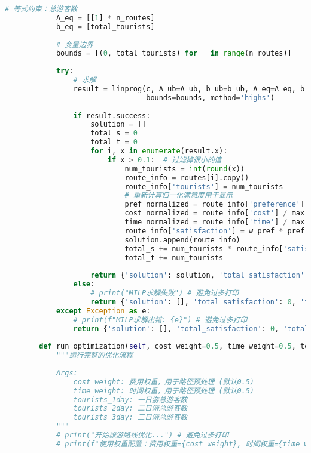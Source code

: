 \begin{lstlisting}[language=Python]
            # 等式约束：总游客数
            A_eq = [[1] * n_routes]
            b_eq = [total_tourists]
            
            # 变量边界
            bounds = [(0, total_tourists) for _ in range(n_routes)]
            
            try:
                # 求解
                result = linprog(c, A_ub=A_ub, b_ub=b_ub, A_eq=A_eq, b_eq=b_eq, 
                                 bounds=bounds, method='highs')
                
                if result.success:
                    solution = []
                    total_s = 0
                    total_t = 0
                    for i, x in enumerate(result.x):
                        if x > 0.1:  # 过滤掉很小的值
                            num_tourists = int(round(x))
                            route_info = routes[i].copy()
                            route_info['tourists'] = num_tourists
                            # 重新计算归一化满意度用于显示
                            pref_normalized = route_info['preference'] / get_max_preference(route_info['type'])
                            cost_normalized = route_info['cost'] / max_cost
                            time_normalized = route_info['time'] / max_time
                            route_info['satisfaction'] = w_pref * pref_normalized - w_cost * cost_normalized - w_time * time_normalized
                            solution.append(route_info)
                            total_s += num_tourists * route_info['satisfaction']
                            total_t += num_tourists
                    
                    return {'solution': solution, 'total_satisfaction': total_s, 'total_tourists': total_t}
                else:
                    # print("MILP求解失败") # 避免过多打印
                    return {'solution': [], 'total_satisfaction': 0, 'total_tourists': 0}
            except Exception as e:
                # print(f"MILP求解出错: {e}") # 避免过多打印
                return {'solution': [], 'total_satisfaction': 0, 'total_tourists': 0}
        
        def run_optimization(self, cost_weight=0.5, time_weight=0.5, tourists_1day=30000, tourists_2day=30000, tourists_3day=20000):
            """运行完整的优化流程
            
            Args:
                cost_weight: 费用权重，用于路径预处理 (默认0.5)
                time_weight: 时间权重，用于路径预处理 (默认0.5)
                tourists_1day: 一日游总游客数
                tourists_2day: 二日游总游客数
                tourists_3day: 三日游总游客数
            """
            # print("开始旅游路线优化...") # 避免过多打印
            # print(f"使用权重配置：费用权重={cost_weight}, 时间权重={time_weight}")
            

\end{lstlisting}
